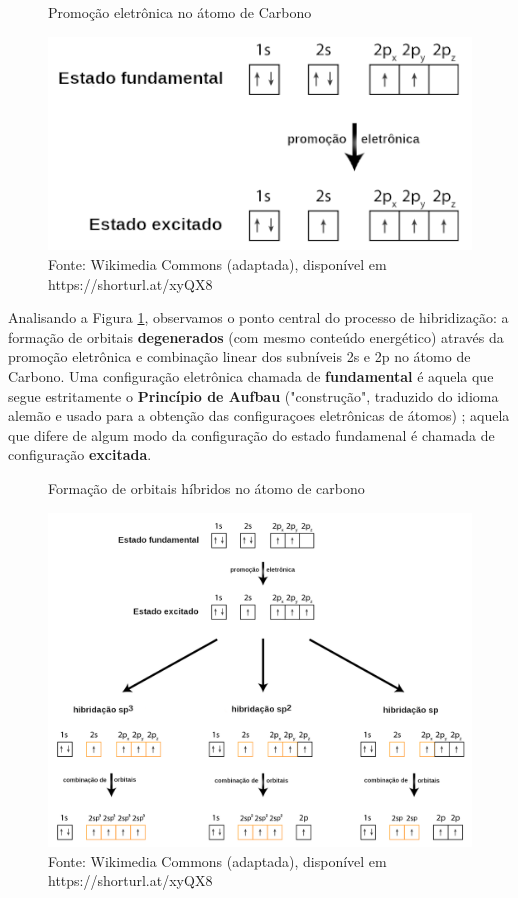 \begin{figure}[h]
\centering
\caption{Promoção eletrônica no átomo de Carbono}
\vspace{0.25cm}
\label{fig:fundexcit}
\includegraphics[width=0.7\linewidth]{imagens/fund_excit.png}
\caption*{Fonte: Wikimedia Commons (adaptada), disponível em https://shorturl.at/xyQX8}
\end{figure}

Analisando a Figura \ref{fig:fundexcit}, observamos o ponto central do processo de hibridização: a formação de orbitais \textbf{degenerados} (com mesmo conteúdo energético) através da promoção eletrônica e combinação linear dos subníveis 2s e 2p no átomo de Carbono. Uma configuração eletrônica chamada de \textbf{fundamental} é aquela que segue estritamente o \textbf{Princípio de Aufbau} ("construção", traduzido do idioma alemão e usado para a obtenção das configuraçoes eletrônicas de átomos) \cite{aufbau}; aquela que difere de algum modo da configuração do estado fundamenal é chamada de configuração \textbf{excitada}.

\begin{figure}[h]
\centering
\caption{Formação de orbitais híbridos no átomo de carbono}
\vspace{0.25cm}
\label{fig:hibridacao_traduzida}
\includegraphics[width=1\linewidth]{imagens/Hybridization_of_carbon.png}
\caption*{Fonte: Wikimedia Commons (adaptada), disponível em https://shorturl.at/xyQX8}
\end{figure}

